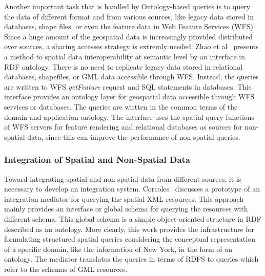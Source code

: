 \documentclass[a4paper,12pt]{article}
\begin{document}
Another important task that is handled by Ontology-based queries is to query 
the data of different format and from various sources,
like legacy data stored in databases, shape files, 
or even the feature data in Web Feature Services (WFS).
Since a huge amount of the geospatial data is increasingly provided
distributed over sources,
a sharing accesses strategy is extremly needed.
Zhao et al~\cite{Zhao2008} presents a method to spatial data 
interoperability at semantic level by an interface in RDF ontology. 
There is no need to replicate legacy data stored in relational databases, shapefiles, or GML data accessible through WFS. Instead, the queries are written to WFS \textit{getFeature} request and SQL statements in databases. 
This interface provides an ontology layer for geospatial data accessible through WFS services or databases. 
The queries are wirtten in the common terms of the domain and application ontology. 
The interface uses the spatial query functions of WFS servers for feature rendering and relational databases as sources for non-spatial data, since this can improve the performance of non-spatial queries. 

\subsubsection{Integration of Spatial and Non-Spatial Data}
\label{integration}
Toward integrating spatial and non-spatial data from different sources, 
it is necessary to develop an integration system. 
Corcoles~\cite{corcoles2003} discusses a prototype of an integration mediator for querying the spatial XML resources. 
This approach mainly provides an interface or global schema for querying the resources with different schema. 
This global schema is a simple object-oriented structure in RDF described as an ontology. 
More clearly, this work provides the infrastructure for formulating structured spatial queries 
considering the conceptual representation of a specific domain, like the information of New York, 
in the form of an ontology. The mediator translates the queries in terms of RDFS to queries which refer to the schemas of GML resources.
\end{document}
